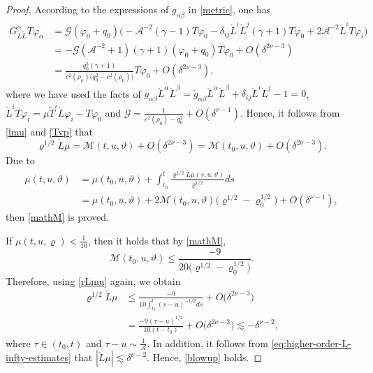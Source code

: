 \documentclass[11pt,twoside]{article}
\def\al{\alpha}
\def\vp{\varphi}
\begin{document}
\begin{proof}
 According to the expressions of $g_{\alpha\beta}$ in \eqref{metric}, one has
 \begin{equation*}
 \begin{split}
 G_{\mathring{L}\mathring{L}}^\al T\varphi_\al
 &= \mathcal{G}(\varphi_0 + q_0)
 \big(
 -\mathcal{A}^{-2}(\gamma- 1)T\varphi_0
 -\delta_{ij}\mathring{L}^i\mathring{L}^j(\gamma+1)T\varphi_0
 + 2\mathcal{A}^{-2}\mathring{L}^iT\varphi_i
 \big) \\
 &= -\mathcal{G}(\mathcal{A}^{-2} + 1)(\gamma+ 1)(\varphi_0 + q_0)T\varphi_0
 + O(\delta^{2\nu - 3}) \\
 &= \frac{q_0^3(\gamma+ 1)}{c^2(\rho_0)\big(q_{0}^{2}-c^{2}(\rho_{0}) \big)}T\varphi_0
 + O(\delta^{2\nu - 3}),
 \end{split}
 \end{equation*}
 where we have used the facts of $g_{\alpha\beta}\mathring{L}^\alpha\mathring{L}^\beta
 = \check{g}_{\alpha\beta}\mathring{L}^\alpha\mathring{L}^\beta
 + \delta_{ij}\mathring{L}^i\mathring{L}^j-1=0$, $\mathring L^iT\vp_i=\mu\tilde T^i\mathring L\vp_i-T\vp_0$
 and $\mathcal{G} = \frac{1}{c^2(\rho_0) - q_0^2} + O(\delta^{\nu - 1})$.
 Hence, it follows from \eqref{lmu} and \eqref{Tvp} that
 \begin{equation}\label{rLmu}
 \varrho^{1/2}\mathring{L}\mu=\mathscr{M}(t, u, \vartheta) + O(\delta^{2\nu - 3})
 =\mathscr{M}(t_0, u, \vartheta) + O(\delta^{2\nu-3}).
 \end{equation}
 Due to
 \begin{equation*}
 \begin{split}
 \mu(t,u,\vartheta)
 &= \mu(t_0,u,\vartheta)
 + \int_{t_0}^t \frac{\varrho^{1/2}\mathring{L}\mu(s,u,\vartheta)}{\varrho^{1/2}}ds \\
 &= \mu(t_0,u,\vartheta)
 + 2\mathscr{M}(t_0,u,\vartheta)\big(\varrho^{1/2} - \varrho_0^{1/2}\big)
 + O(\delta^{\nu - 1}),
 \end{split}
 \end{equation*}
 then \eqref{mathM} is proved.

If $\mu(t,u,\varrho) < \frac{1}{10}$, then it holds that by \eqref{mathM},
\[
\mathscr{M}(t_0,u,\vartheta) \leq \frac{-9}{20\big(\varrho^{1/2} - \varrho_0^{1/2}\big)}.
\]
Therefore, using \eqref{rLmu} again, we obtain
\begin{equation*}
\begin{split}
\varrho^{1/2}\mathring{L}\mu
&\leq \frac{-9}{10\int_{t_0}^t (s-u)^{-1/2}ds} + O\big(\delta^{2\nu-3}\big) \\
&= \frac{-9(\tau-u)^{1/2}}{10(t-t_0)} + O\big(\delta^{2\nu-3}\big)
\lesssim -\delta^{\nu-2},
\end{split}
\end{equation*}
where $\tau \in (t_0,t)$ and $\tau - u \sim \frac{1}{\mathcal{A}}$. In addition, it follows from \eqref{eq:higher-order-L-infty-estimates} that $|\mathring{L}\mu| \lesssim \delta^{\nu-2}$. Hence, \eqref{blowup} holds.
\end{proof}
\end{document}
